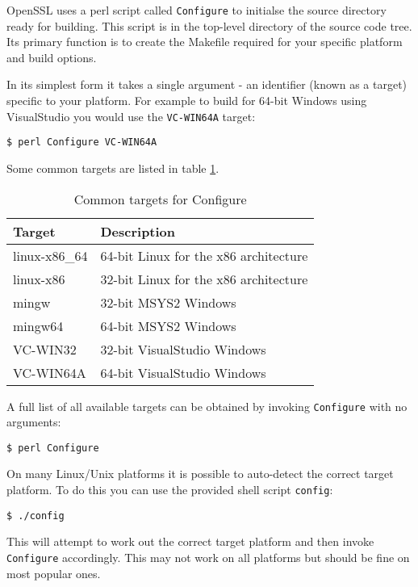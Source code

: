 OpenSSL uses a perl script called \verb!Configure! to initialse the source directory
ready for building. This script is in the top-level directory of the source code
tree. Its primary function is to create the Makefile required for your specific
platform and build options.

In its simplest form it takes a single argument - an identifier (known as a
target) specific to your platform. For example to build for 64-bit Windows using
VisualStudio you would use the \verb!VC-WIN64A! target:

\begin{verbatim}
$ perl Configure VC-WIN64A
\end{verbatim}

Some common targets are listed in table \ref{tab:configure-targets}.

\begin{table}[tb]
\centering
\begin{tabular}{|l|l|}
\hline
\rowcolor{LightGray}
Target & Description \\
\hline
linux-x86\_64 & 64-bit Linux for the x86 architecture \\
\hline
linux-x86 & 32-bit Linux for the x86 architecture \\
\hline
mingw & 32-bit MSYS2 Windows \\
\hline
mingw64 & 64-bit MSYS2 Windows \\
\hline
VC-WIN32 & 32-bit VisualStudio Windows \\
\hline
VC-WIN64A & 64-bit VisualStudio Windows \\
\hline
\end{tabular}
\caption{Common targets for Configure}
\label{tab:configure-targets}
\end{table}

A full list of all available targets can be obtained by invoking \verb!Configure!
with no arguments:

\begin{verbatim}
$ perl Configure
\end{verbatim}

On many Linux/Unix platforms it is possible to auto-detect the correct target
platform. To do this you can use the provided shell script \verb!config!:

\begin{verbatim}
$ ./config
\end{verbatim}

This will attempt to work out the correct target platform and then invoke
\verb!Configure! accordingly. This may not work on all platforms but should be fine
on most popular ones.

